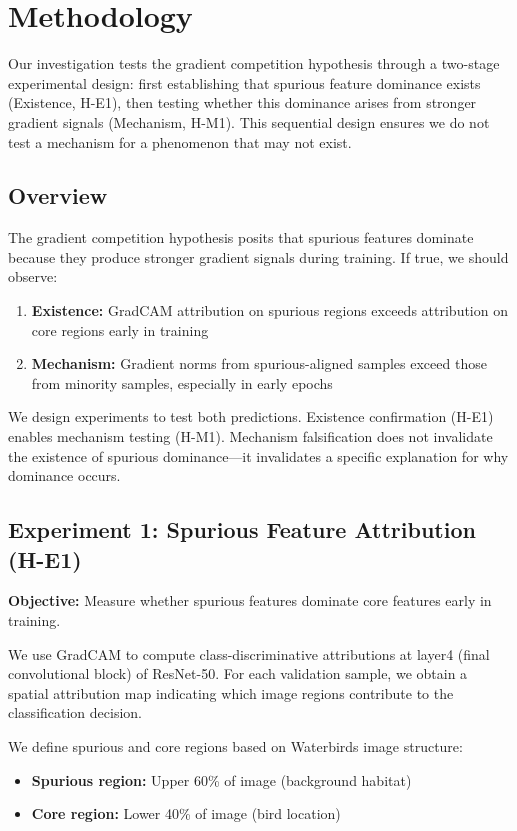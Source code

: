 \section{Methodology}

Our investigation tests the gradient competition hypothesis through a two-stage experimental design: first establishing that spurious feature dominance exists (Existence, H-E1), then testing whether this dominance arises from stronger gradient signals (Mechanism, H-M1). This sequential design ensures we do not test a mechanism for a phenomenon that may not exist.

\subsection{Overview}

The gradient competition hypothesis posits that spurious features dominate because they produce stronger gradient signals during training. If true, we should observe:

\begin{enumerate}
    \item \textbf{Existence:} GradCAM attribution on spurious regions exceeds attribution on core regions early in training
    \item \textbf{Mechanism:} Gradient norms from spurious-aligned samples exceed those from minority samples, especially in early epochs
\end{enumerate}

We design experiments to test both predictions. Existence confirmation (H-E1) enables mechanism testing (H-M1). Mechanism falsification does not invalidate the existence of spurious dominance---it invalidates a specific explanation for why dominance occurs.

\subsection{Experiment 1: Spurious Feature Attribution (H-E1)}

\textbf{Objective:} Measure whether spurious features dominate core features early in training.

We use GradCAM \citep{Selvaraju2017GradCAM} to compute class-discriminative attributions at layer4 (final convolutional block) of ResNet-50. For each validation sample, we obtain a spatial attribution map indicating which image regions contribute to the classification decision.

We define spurious and core regions based on Waterbirds image structure:
\begin{itemize}
    \item \textbf{Spurious region:} Upper 60\% of image (background habitat)
    \item \textbf{Core region:} Lower 40\% of image (bird location)
\end{itemize}

